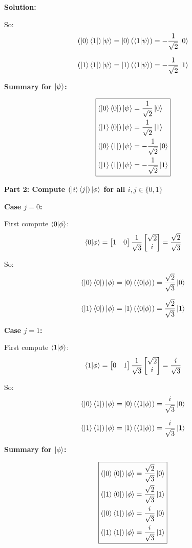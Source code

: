 \documentclass[11pt]{article}
\newenvironment{solution}
{\par\noindent\textbf{Solution:}\par}
{\vspace{1em}}
\begin{document}
\begin{solution}
So:
\[(\ket{0}\bra{1})\ket{\psi} = \ket{0}(\bra{1}\ket{\psi}) = -\frac{1}{\sqrt{2}}\ket{0}\]

\[(\ket{1}\bra{1})\ket{\psi} = \ket{1}(\bra{1}\ket{\psi}) = -\frac{1}{\sqrt{2}}\ket{1}\]

\textbf{Summary for $\ket{\psi}$:}

\[\boxed{\begin{aligned}
(\ket{0}\bra{0})\ket{\psi} &= \frac{1}{\sqrt{2}}\ket{0} \\
(\ket{1}\bra{0})\ket{\psi} &= \frac{1}{\sqrt{2}}\ket{1} \\
(\ket{0}\bra{1})\ket{\psi} &= -\frac{1}{\sqrt{2}}\ket{0} \\
(\ket{1}\bra{1})\ket{\psi} &= -\frac{1}{\sqrt{2}}\ket{1}
\end{aligned}}\]

\textbf{Part 2: Compute $(\ket{i}\bra{j})\ket{\phi}$ for all $i,j \in \{0,1\}$}

\textbf{Case $j=0$:}

First compute $\bra{0}\ket{\phi}$:
\[\bra{0}\ket{\phi} = \begin{bmatrix}1 & 0\end{bmatrix}\frac{1}{\sqrt{3}}\begin{bmatrix}\sqrt{2} \\ i\end{bmatrix} = \frac{\sqrt{2}}{\sqrt{3}}\]

So:
\[(\ket{0}\bra{0})\ket{\phi} = \ket{0}(\bra{0}\ket{\phi}) = \frac{\sqrt{2}}{\sqrt{3}}\ket{0}\]

\[(\ket{1}\bra{0})\ket{\phi} = \ket{1}(\bra{0}\ket{\phi}) = \frac{\sqrt{2}}{\sqrt{3}}\ket{1}\]

\textbf{Case $j=1$:}

First compute $\bra{1}\ket{\phi}$:
\[\bra{1}\ket{\phi} = \begin{bmatrix}0 & 1\end{bmatrix}\frac{1}{\sqrt{3}}\begin{bmatrix}\sqrt{2} \\ i\end{bmatrix} = \frac{i}{\sqrt{3}}\]

So:
\[(\ket{0}\bra{1})\ket{\phi} = \ket{0}(\bra{1}\ket{\phi}) = \frac{i}{\sqrt{3}}\ket{0}\]

\[(\ket{1}\bra{1})\ket{\phi} = \ket{1}(\bra{1}\ket{\phi}) = \frac{i}{\sqrt{3}}\ket{1}\]

\textbf{Summary for $\ket{\phi}$:}

\[\boxed{\begin{aligned}
(\ket{0}\bra{0})\ket{\phi} &= \frac{\sqrt{2}}{\sqrt{3}}\ket{0} \\
(\ket{1}\bra{0})\ket{\phi} &= \frac{\sqrt{2}}{\sqrt{3}}\ket{1} \\
(\ket{0}\bra{1})\ket{\phi} &= \frac{i}{\sqrt{3}}\ket{0} \\
(\ket{1}\bra{1})\ket{\phi} &= \frac{i}{\sqrt{3}}\ket{1}
\end{aligned}}\]

\end{solution}
\end{document}
